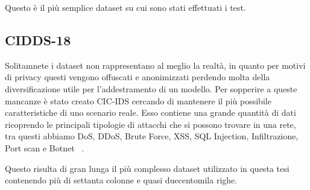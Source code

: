 Questo è il più semplice dataset su cui sono stati effettuati i test.

\subsection{CIDDS-18}

Solitamnete i dataset non rappresentano al meglio la realtà, in quanto per motivi di privacy questi vengono offuscati e anonimizzati perdendo molta della diversificazione utile per l'addestramento di un modello.
Per sopperire a queste mancanze è stato creato CIC-IDS cercando di mantenere il più possibile caratteristiche di uno scenario reale.
Esso contiene una grande quantità di dati ricoprendo le principali tipologie di attacchi che si possono trovare in una rete, tra questi abbiamo DoS, DDoS, Brute Force, XSS, SQL Injection, Infiltrazione, Port scan e Botnet ~\cite{sharafaldinGeneratingNewIntrusion2018}.

Questo risulta di gran lunga il più complesso dataset utilizzato in questa tesi contenendo più di settanta colonne e quasi duecentomila righe.

